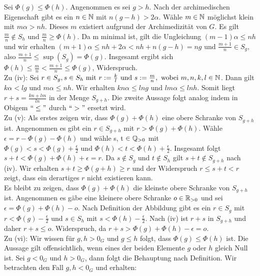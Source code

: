 {Sei $\Phi\left(g\right) \le \Phi\left(h\right)$. Angenommen es sei $g > h$. Nach der archimedischen Eigenschaft gibt es ein $ n \in \mathbb{N}$ mit $n\left(g-h\right) > 2\alpha$. Wähle $m \in \mathbb{N}$ möglichst klein mit $m\alpha > nh$. Dieses $m$ existiert aufgrund der Archimedizität von $G$. Es gilt $\frac{m}{n} \notin S_h$ und $\frac{m}{n} \geq \Phi\left(h\right).$
Da m minimal ist, gilt die Ungleichung $\left(m-1\right)\alpha \le nh$ und wir erhalten $ \left(m+1\right)\alpha \le nh + 2\alpha < nh + n(g-h) = ng$ und $\frac{m+1}{n} \in S_g,$ also $\frac{m+1}{n} \leq\sup\left(S_g\right) = \Phi\left(g\right)$. Insgesamt ergibt sich $\Phi\left(h\right) \le \frac{m}{n} < \frac{m + 1}{n} \le \Phi\left(g\right)$, Widerspruch.\\
%
%
%
%
%
%
Zu (iv): Sei $r \in S_g, s \in S_h \text{ mit } r := \frac{k}{l} \text{ und } s:= \frac{m}{n}, \text{ wobei } m, n ,k, l \in \mathbb{N}$. Dann gilt $k\alpha < lg $ und $ m\alpha \le nh$. Wir erhalten $kn\alpha \le lng \text{ und } lm\alpha \le lnh.$ Somit liegt $r+s = \frac{kn+lm}{ln}$ in der Menge $S_{g+h}.$ Die zweite Aussage folgt analog indem in Obigem $``\le"$ durch $``>"$ ersetzt wird.\\
%
%
%
%
%
%
Zu (v): Als erstes zeigen wir, dass $\Phi\left(g\right)+\Phi\left(h\right)$ eine obere Schranke von $S_{g+h}$ ist. Angenommen es gibt ein $r\in S_{g+h}$ mit $r > \Phi\left(g\right)+\Phi\left(h\right)$. Wähle $\epsilon = r - \Phi\left(g\right) - \Phi\left(h\right)$ und wähle s, t $\in \mathbb{Q}_{>0}$ mit $\Phi(g) < s < \Phi(g) + \frac{\epsilon}{2} \text{ und } \Phi\left(h\right) < t < \Phi\left(h\right) +\frac{\epsilon}{2}$. Insgesamt folgt $s + t < \Phi\left(g\right) + \Phi\left(h\right) + \epsilon = r$. Da $s \notin S_g$ und $t \notin S_h$ gilt $s+t \notin S_{g+h}$ nach (iv). Wir erhalten $s+ t \geq \Phi\left(g+h\right) \geq r$ und der Widerspruch $ r \le s+t < r$ zeigt, dass ein derartiges $r$ nicht existieren kann.\\
Es bleibt zu zeigen, dass $\Phi\left(g\right)+\Phi\left(h\right)$ die kleinste obere Schranke von $S_{g+h}$ ist. Angenommen es gäbe eine kleinere obere Schranke $ o \in \mathbb{R}_{>0}$ und sei $\epsilon = \Phi(g) + \Phi(h) - o$. Nach Definition der Abbildung gibt es ein $r\in S_g$ mit $r < \Phi(g) - \frac{\epsilon}{2}$ und $ s \in S_h$ mit $s < \Phi(h) - \frac{\epsilon}{2}.$ Nach (iv) ist $r+s$ in $S_{g+h} $ und daher $ r +s \le o$. Widerspruch, da $r+s >\Phi(g) + \Phi(h) - \epsilon = o$.\\
%
%
%
%
%
Zu (vi): Wir wissen für $g, h > 0_G$ und $g \leq h$ folgt, dass $\Phi(g) \leq \Phi(h)$ ist. Die Aussage gilt offensichtlich, wenn eines der beiden Elemente $g$ oder $h$ gleich Null ist. Sei $g < 0_G \text{ und } h > 0_G$, dann folgt die Behauptung nach Definition. Wir betrachten den Fall $g, h < 0_G$ und erhalten:
}
